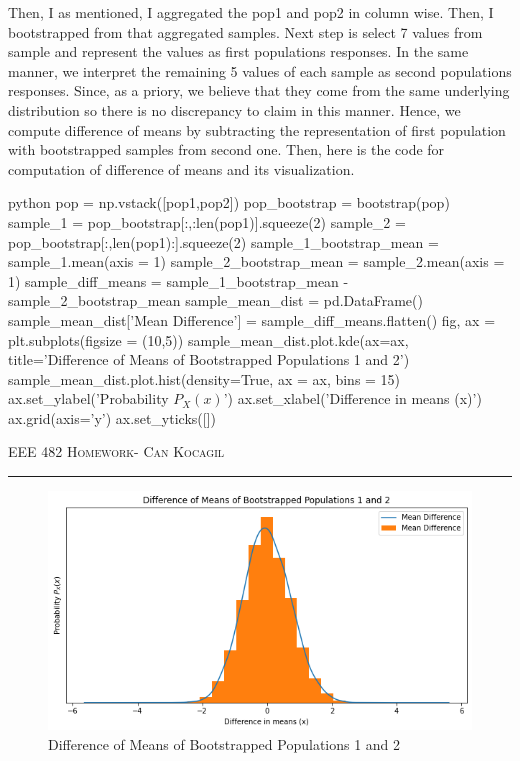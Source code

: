 \documentclass[12pt]{amsart}
\begin{document}
Then, I as mentioned, I aggregated the pop1 and pop2 in column wise. Then, I bootstrapped from that aggregated samples. Next step is select 7 values from  sample and represent the values as first populations responses. In the same manner, we interpret the remaining 5 values of each sample as second populations responses. Since, as a priory, we believe that they come from the same underlying distribution so there is no discrepancy to claim in this manner. Hence, we compute difference of means by subtracting the representation of first population with bootstrapped samples from second one. Then, here is the code for computation of difference of means and its visualization.

\begin{mintedbox}{python}
pop = np.vstack([pop1,pop2])
pop_bootstrap = bootstrap(pop)
sample_1 = pop_bootstrap[:,:len(pop1)].squeeze(2)
sample_2 = pop_bootstrap[:,len(pop1):].squeeze(2)
sample_1_bootstrap_mean = sample_1.mean(axis = 1)
sample_2_bootstrap_mean = sample_2.mean(axis = 1)
sample_diff_means = sample_1_bootstrap_mean - sample_2_bootstrap_mean
sample_mean_dist = pd.DataFrame()
sample_mean_dist['Mean Difference'] = sample_diff_means.flatten()
fig, ax = plt.subplots(figsize = (10,5))
sample_mean_dist.plot.kde(ax=ax, title='Difference of Means of Bootstrapped Populations 1 and 2')
sample_mean_dist.plot.hist(density=True, ax = ax, bins = 15)
ax.set_ylabel('Probability $P_X(x)$')
ax.set_xlabel('Difference in means (x)')
ax.grid(axis='y')
ax.set_yticks([])
\end{mintedbox}

\newpage
{\scshape EEE 482} \hfill {\scshape \large  Homework-\relax} \hfill {\scshape Can Kocagil}
\smallskip
\hrule
\vspace{2mm}

\begin{figure}[h]
    \centering
    \includegraphics[width = 1\textwidth]{images/5.png}
    \caption{Difference of Means of Bootstrapped Populations 1 and 2}
\end{figure}
\end{document}
